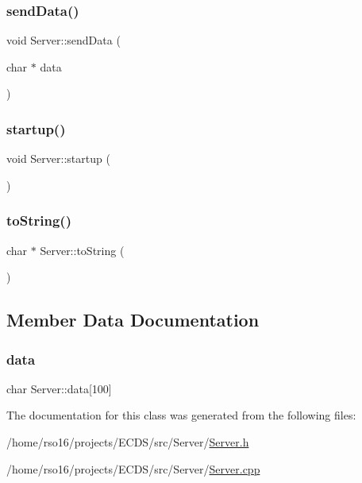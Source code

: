 \mbox{\label{classServer_a5061ce779b01e1c5cf8146022db8b08d}} 
\subsubsection{\texorpdfstring{send\+Data()}{sendData()}}
{\footnotesize\ttfamily void Server\+::send\+Data (\begin{DoxyParamCaption}\item[{char $\ast$}]{data }\end{DoxyParamCaption})}

\mbox{\label{classServer_aaa7517710dd809ba4d965eb83801fd05}} 
\subsubsection{\texorpdfstring{startup()}{startup()}}
{\footnotesize\ttfamily void Server\+::startup (\begin{DoxyParamCaption}{ }\end{DoxyParamCaption})}

\mbox{\label{classServer_aee9a13517df765d3c085fab605f24be4}} 
\subsubsection{\texorpdfstring{to\+String()}{toString()}}
{\footnotesize\ttfamily char $\ast$ Server\+::to\+String (\begin{DoxyParamCaption}{ }\end{DoxyParamCaption})}



\subsection{Member Data Documentation}
\mbox{\label{classServer_a511bae2c5604c196eb714c798fdf709d}} 
\subsubsection{\texorpdfstring{data}{data}}
{\footnotesize\ttfamily char Server\+::data\mbox{[}100\mbox{]}}



The documentation for this class was generated from the following files\+:\begin{DoxyCompactItemize}
\item 
/home/rso16/projects/\+E\+C\+D\+S/src/\+Server/\hyperlink{Server_8h}{Server.\+h}\item 
/home/rso16/projects/\+E\+C\+D\+S/src/\+Server/\hyperlink{Server_8cpp}{Server.\+cpp}\end{DoxyCompactItemize}
